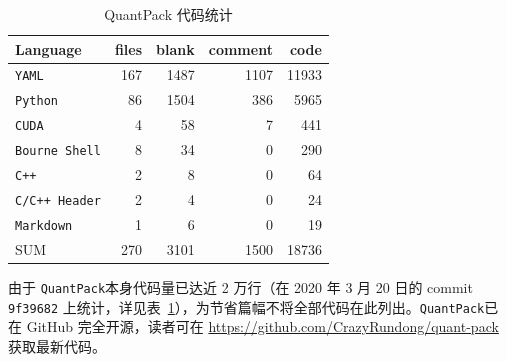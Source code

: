 \documentclass[
  fontset = mac,
]{shtthesis}
\providecommand{\QP}{\texttt{QuantPack}}
\begin{document}
\begin{table}[htb]
  \centering
  \caption{QuantPack 代码统计}
  \label{tab::aappendix::cloc}
  \begin{tabular}{l *{4}{r}}
    \toprule
    Language &                   files &        blank &      comment &         code \\
    \midrule
    \texttt{YAML} &                         167 &         1487 &         1107 &        11933 \\
    \texttt{Python} &                        86 &         1504 &          386 &         5965 \\
    \texttt{CUDA} &                           4 &           58 &            7 &          441 \\
    \texttt{Bourne Shell} &                   8 &           34 &            0 &          290 \\
    \texttt{C++} &                            2 &            8 &            0 &           64 \\
    \texttt{C/C++ Header} &                   2 &            4 &            0 &           24 \\
    \texttt{Markdown} &                       1 &            6 &            0 &           19 \\
    \hdashline
    SUM &                          270 &         3101 &         1500 &        18736 \\
    \bottomrule
  \end{tabular}
\end{table}

由于 \QP 本身代码量已达近 2 万行（在 2020 年 3 月 20 日的 commit \verb|9f39682| 上统计，详见表~\ref{tab::aappendix::cloc}），为节省篇幅不将全部代码在此列出。\QP 已在 GitHub 完全开源，读者可在 \url{https://github.com/CrazyRundong/quant-pack} 获取最新代码。
\end{document}
